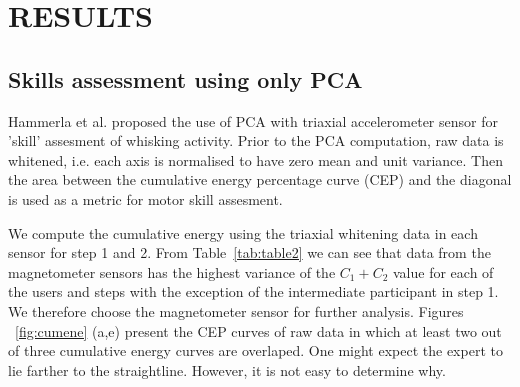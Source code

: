 \documentclass{sigchi}
\begin{document}
\section{RESULTS}

\subsection{Skills assessment using only PCA}
Hammerla et al. \cite{Hammerla2011} proposed the use of PCA with triaxial accelerometer sensor for 'skill' assesment 
of whisking activity. Prior to the PCA computation, raw data is whitened, i.e. each axis is normalised to have zero mean and unit variance.
Then the area between the cumulative energy percentage curve (CEP) and the diagonal is used as a metric for motor skill assesment.

We compute the cumulative energy using the triaxial whitening data in each sensor for step 1 and 2.
From Table~\ref{tab:table2} we can see that data from the magnetometer sensors has the highest variance 
of the $C_1 + C_2$ value for each of the users and steps with the exception of the intermediate participant in step 1. 
We therefore choose the magnetometer sensor for further analysis.
Figures ~\ref{fig:cumene} (a,e) present the CEP curves of raw data in which at least two out of three cumulative energy curves are overlaped. 
One might expect the expert to lie farther to the straightline. However, it is not easy to determine why.
\end{document}
